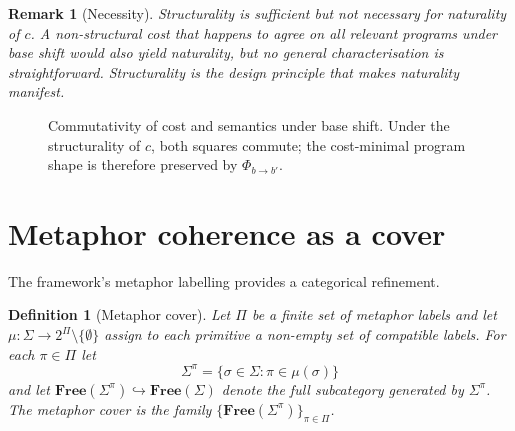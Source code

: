 \documentclass[11pt]{article}
\newtheorem{definition}{Definition}
\newtheorem{remark}{Remark}
\begin{document}
\begin{remark}[Necessity]
Structurality is sufficient but not necessary for naturality of $c$.
A non-structural cost that happens to agree on all relevant programs
under base shift would also yield naturality, but no general
characterisation is straightforward. Structurality is the design
principle that makes naturality manifest.
\end{remark}

\begin{figure}[t]
\centering
{}
\caption{Commutativity of cost and semantics under base shift. Under
the structurality of $c$, both squares commute; the cost-minimal
program shape is therefore preserved by $\Phi_{b\to b'}$.}
\label{fig:diagram}
\end{figure}

\section{Metaphor coherence as a cover}\label{sec:metaphor}

The framework's metaphor labelling provides a categorical refinement.

\begin{definition}[Metaphor cover]
Let $\Pi$ be a finite set of metaphor labels and let $\mu : \Sigma \to
2^\Pi \setminus \{\emptyset\}$ assign to each primitive a non-empty
set of compatible labels. For each $\pi \in \Pi$ let
\[
\Sigma^\pi = \{\sigma \in \Sigma : \pi \in \mu(\sigma)\}
\]
and let $\mathbf{Free}(\Sigma^\pi) \hookrightarrow
\mathbf{Free}(\Sigma)$ denote the full subcategory generated by
$\Sigma^\pi$. The \emph{metaphor cover} is the family
$\{\mathbf{Free}(\Sigma^\pi)\}_{\pi \in \Pi}$.
\end{definition}
\end{document}
